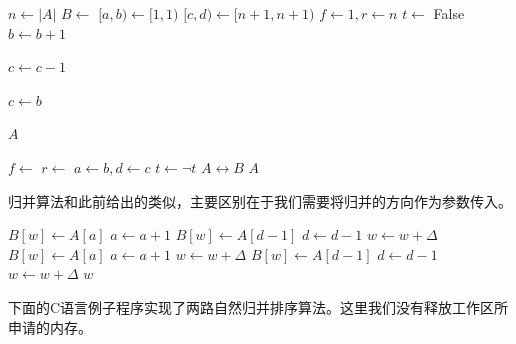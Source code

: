 \documentclass[b5paper]{ctexart}
\begin{document}
\begin{algorithmic}[1]
    \State $n \gets |A|$
    \State $B \gets$   
    \Loop
      \State $[a, b) \gets [1, 1)$
      \State $[c, d) \gets [n+1, n+1)$
      \State $f \gets 1, r \gets n$ 
      \State $t \gets $ False 
       
        \Repeat \Comment{扩展$[a, b)$}
          \State $b \gets b + 1$

        \Repeat \Comment{扩展$[c, d)$}
          \State $c \gets c - 1$

         
          \State $c \gets b$
        \EndIf

         \Comment{若$[a, b)$扩展到整个数组则结束}
          \State \Return $A$
        \EndIf

         
          \State $f \gets$ \Call{Merge}{$A, [a, b), [c, d), B, f, 1$}
        \Else {}
          \State $r \gets$ \Call{Merge}{$A, [a, b), [c, d), B, r, -1$}
        \EndIf
        \State $a \gets b, d \gets c$
        \State $t \gets \lnot t$ 
      \EndWhile
      \State {} $A \leftrightarrow B$ 
    \EndLoop
  \EndIf
  \State \Return $A$
\EndFunction
\end{algorithmic}

归并算法和此前给出的类似，主要区别在于我们需要将归并的方向作为参数传入。

\begin{algorithmic}[1]
\Function{Merge}{$A, [a, b), [c, d), B, w, \Delta$}
      \State $B[w] \gets A[a]$
      \State $a \gets a + 1$
    \Else
      \State $B[w] \gets A[d-1]$
      \State $d \gets d - 1$
    \EndIf
    \State $w \gets w + \Delta$
  \EndWhile
    \State $B[w] \gets A[a]$
    \State $a \gets a + 1$
    \State $w \gets w + \Delta$
  \EndWhile
    \State $B[w] \gets A[d-1]$
    \State $d \gets d - 1$
    \State $w \gets w + \Delta$
  \EndWhile
  \State \Return $w$
\EndFunction
\end{algorithmic}

下面的C语言例子程序实现了两路自然归并排序算法。这里我们没有释放工作区所申请的内存。
\end{document}
